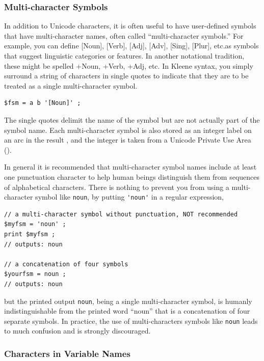 \subsubsection{Multi-character Symbols}

In addition to Unicode characters, it is often useful to have user-defined symbols that
have multi-character names, often called ``multi-character symbols.''  For example, you can
define [Noun], [Verb], [Adj], [Adv], [Sing], [Plur], etc.\@ as symbols that suggest
linguistic categories or features.  In another notational tradition, these might be spelled +Noun,
+Verb, +Adj, etc.  In Kleene syntax, you simply surround a string of characters in single quotes
to indicate that they are to be treated as a single multi-character symbol.


\begin{Verbatim}
$fsm = a b '[Noun]' ;
\end{Verbatim}

\noindent
The single quotes delimit the name of the symbol but are not actually part of the symbol
name.  Each multi-character symbol is also stored as an integer label on an arc in the result
\fsm{}, and the integer is taken from a Unicode Private Use Area ().

In general it is recommended that multi-character symbol names include at least
one punctuation character to help human beings distinguish them from sequences of
alphabetical characters.  There is nothing to prevent you from using a
multi-character symbol like \texttt{noun}, by putting \verb!'noun'! in a regular
expression,


\begin{Verbatim}
// a multi-character symbol without punctuation, NOT recommended
$myfsm = 'noun' ;
print $myfsm ;
// outputs: noun

// a concatenation of four symbols
$yourfsm = noun ;
// outputs: noun
\end{Verbatim}

\noindent
but the printed output \texttt{noun}, being a single multi-character symbol,
is humanly indistinguishable from the printed word ``noun''
that is a concatenation of four separate symbols.  In practice, the use of
multi-characters symbols like \verb'noun' leads to much confusion and is
strongly discouraged.  

\subsubsection{Characters in Variable Names}

